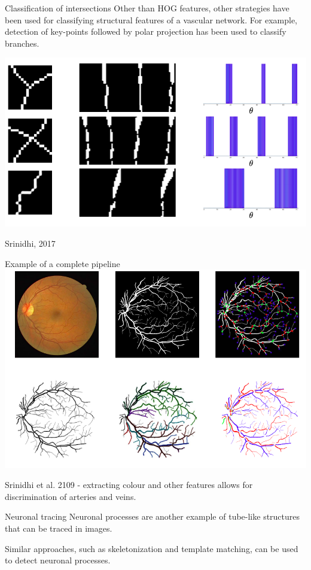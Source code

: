 \documentclass[9pt, aspectratio=169]{beamer}
\begin{document}
\begin{frame}
    {Classification of intersections}
    Other than HOG features, other strategies have been used for classifying structural features of a vascular network. For example, detection of key-points followed by polar projection has been used to classify branches.

    \centering
    \includegraphics[width=.7\textwidth]
    {polar_map_classification_intersections.png}

    \footnotesize
    \raggedright
    Srinidhi, 2017
\end{frame}

\begin{frame}
    {Example of a complete pipeline}
    \centering
    \includegraphics[width=.8\textwidth]{retina_pipeline.png}

    \footnotesize
    Srinidhi et al. 2109 - extracting colour and other features allows for discrimination of arteries and veins.
\end{frame}

\begin{frame}
    {Neuronal tracing}
    Neuronal processes are another example of tube-like structures that can be traced in images.

    Similar approaches, such as skeletonization and template matching, can be used to detect neuronal processes.
\end{frame}
\end{document}
